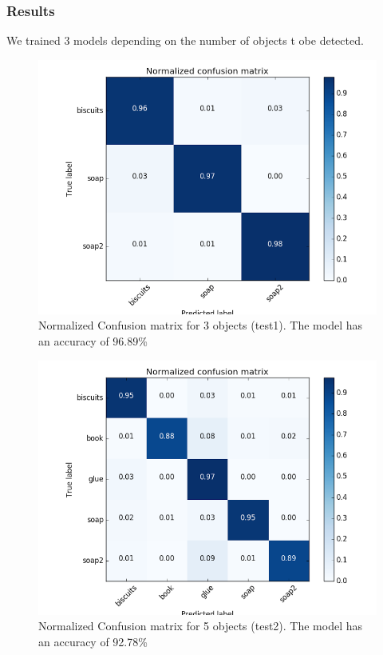 \documentclass[a4paper,12pt]{report}
\begin{document}
\subsubsection{Results}
We trained 3 models depending on the number of objects t obe detected.
\begin{figure}[H]
\centering
        \includegraphics[totalheight=9cm]{imgs/test1.png}
        \caption{Normalized Confusion matrix for 3 objects (test1). The model has an accuracy of 96.89\%}
\end{figure}
     
\begin{figure}[H]
\centering
        \includegraphics[totalheight=9cm]{imgs/test2.png}
         \caption{Normalized Confusion matrix for 5 objects (test2).  The model has an accuracy of 92.78\%}
\end{figure}
\end{document}
